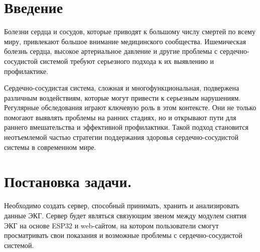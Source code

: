 \documentclass[12pt, russian]{extarticle}
\begin{document}
    \begin{spacing}{1.5}


    \tableofcontents
    \thispagestyle{empty}
    \newpage

    \pagestyle{plain}
    \setcounter{page}{3}

    \newpage
    \section{Введение}

    Болезни сердца и сосудов, которые приводят к большому числу смертей по всему миру,
    привлекают большое внимание медицинского сообщества. Ишемическая болезнь сердца, высокое
    артериальное давление и другие проблемы с сердечно-сосудистой системой требуют серьезного
    подхода к их выявлению и профилактике.

    Сердечно-сосудистая система, сложная и многофункциональная, подвержена различным воздействиям,
    которые могут привести к серьезным нарушениям. Регулярные обследования играют ключевую роль в этом
    контексте. Они не только помогают выявлять проблемы на ранних стадиях, но и открывают пути для
    раннего вмешательства и эффективной профилактики. Такой подход становится неотъемлемой частью
    стратегии поддержания здоровья сердечно-сосудистой системы в современном мире.

    \newpage
    \section{Постановка задачи.}

    Необходимо создать сервер, способный принимать, хранить и анализировать данные ЭКГ.
    Сервер будет являться связующим звеном между модулем снятия ЭКГ на основе ESP32 и web-сайтом,
    на котором пользователи смогут просматривать свои показания и возможные проблемы с сердечно-сосудистой
    системой.


\end{spacing}
\end{document}
